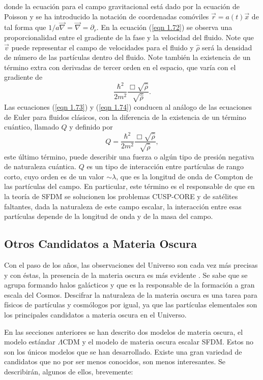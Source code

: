 \documentclass[a4paper,openright,12pt]{book}
\begin{document}
donde la ecuación para el campo gravitacional está dado por la ecuación de Poisson y se ha introducido la notación de coordenadas comóviles $\vec{r} = a(t)\vec{x}$ de tal forma que $1/a\vec{\nabla} = \vec{\nabla} = \partial_{r}$. En la ecuación (\ref{eqn 1.72}) se observa una proporcionalidad entre el gradiente de la fase y la velocidad del fluido. Note que $\vec{v}$ puede representar el campo de velocidades para el fluido y $\hat{\rho}$ será la densidad de número de las partículas dentro del fluido. Note también la existencia de un término extra con derivadas de tercer orden en el espacio, que varía con el gradiente de 
\begin{equation*}
\frac{\hbar^{2}}{2m^{2}}\frac{\Box\sqrt{\hat{\rho}}}{\sqrt{\hat{\rho}}}.
\end{equation*}
Las ecuaciones (\ref{eqn 1.73}) y (\ref{eqn 1.74}) conducen al análogo de las ecuaciones de Euler para fluidos clásicos, con la diferencia de la existencia de un término cuántico, llamado $Q$ y definido por
\begin{equation}
Q = \frac{\hbar^{2}}{2m^{2}}\frac{\Box\sqrt{\hat{\rho}}}{\sqrt{\hat{\rho}}},\label{eqn 1.78}
\end{equation}
este último término, puede describir una fuerza o algún tipo de presión negativa de naturaleza cuántica. $Q$ es un tipo de interacción entre partículas de rango corto, cuyo orden es de un valor $\sim \lambda$, que es la longitud de onda de Compton de las partículas del campo. En particular, este término es el responsable de que en la teoría de SFDM se solucionen los problemas CUSP-CORE y de satélites faltantes, dada la naturaleza de este campo escalar, la interacción entre esas partículas depende de la longitud de onda y de la masa del campo.
\subsection{Otros Candidatos a Materia Oscura}
Con el paso de los años, las observaciones del Universo son cada vez más precisas y con éstas, la presencia de la materia oscura es más evidente \cite{1.3.2.1}. Se sabe que se agrupa formando halos galácticos y que es la responsable de la formación a gran escala del Cosmos. Descifrar la naturaleza de la materia oscura es una tarea para físicos de partículas y cosmólogos por igual, ya que las partículas elementales son los principales candidatos a materia oscura en el Universo. 

En las secciones anteriores se han descrito dos modelos de materia oscura, el modelo estándar $\Lambda$CDM y el modelo de materia oscura escalar SFDM. Estos no son los únicos modelos que se han desarrollado. Existe una gran variedad de candidatos que no por ser menos conocidos, son menos interesantes. Se describirán, algunos de ellos, brevemente:
\end{document}

